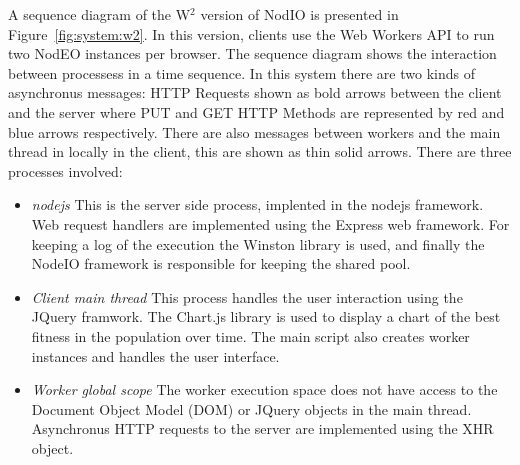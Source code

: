 \documentclass[journal,onecolumn]{IEEEtran}
\begin{document}
A sequence diagram of the W$^2$ version of {\sf NodIO} is presented 
in Figure~\ref{fig:system:w2}. In this version, clients use the Web Workers
API to run two NodEO instances per browser. The sequence diagram shows the 
interaction between processess in a time sequence. In this system there are
two kinds of asynchronus messages: HTTP Requests shown as bold arrows between 
the client and the server where PUT and GET HTTP Methods are represented by 
red and blue arrows respectively. There are also messages between workers and 
the main thread in locally in the client, this are shown as thin solid arrows.
There are three processes involved:
\begin{itemize}
\item {\em nodejs} This is the server side process, implented in the nodejs 
framework. Web request handlers are implemented using the Express web 
framework. For keeping a log of the execution the Winston library is used, and 
finally the NodeIO framework is responsible for keeping the shared pool.
\item {\em Client main thread}  This process handles the user interaction
using the JQuery framwork. The Chart.js library is used to display a chart of
the best fitness in the population over time. The main script also creates 
worker instances and handles the user interface.
\item {\em Worker global scope} The worker execution space does not have 
access to the Document Object Model (DOM) or JQuery objects in the main thread.
Asynchronus HTTP requests to the server are implemented using the XHR object. 
\end{itemize}
\end{document}
